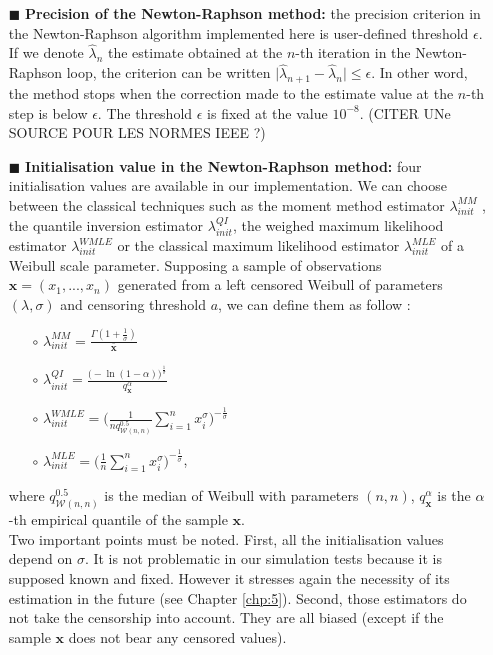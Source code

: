 \begin{itemize}
    \item[$\blacksquare$] \textbf{Precision of the Newton-Raphson method:} the precision criterion in the Newton-Raphson algorithm implemented here is user-defined threshold $\epsilon$. If we denote $\hat\lambda_n$ the estimate obtained at the $n$-th iteration in the Newton-Raphson loop, the criterion can be written $\lvert \hat\lambda_{n+1} - \hat\lambda_n\rvert \leq \epsilon$. In other word, the method stops when the correction made to the estimate value at the $n$-th step is below $\epsilon$. The threshold $\epsilon$ is fixed at the value $10^{-8}$. (CITER UNe SOURCE POUR LES NORMES IEEE ?)
    \item[$\blacksquare$] \textbf{Initialisation value in the Newton-Raphson method:} four initialisation values are available in our implementation. We can choose between the classical techniques such as the moment method estimator $\lambda_{init}^{MM}$ \cite{Johnson1994}, the quantile inversion estimator $\lambda_{init}^{QI}$, the weighed maximum likelihood estimator $\lambda_{init}^{WMLE}$ \cite{sadani2019new} or the classical maximum likelihood estimator $\lambda_{init}^{MLE}$ of a Weibull scale parameter. Supposing a sample of observations $\bm x = (x_1,...,x_n)$ generated from a left censored Weibull of parameters $(\lambda,\sigma)$ and censoring threshold $a$, we can define them as follow : 
    \begin{itemize}
        \item[$\circ$] $\lambda_{init}^{MM} =\frac{\Gamma(1+\frac{1}{\sigma})}{\bar{\bm x}}$ 
        \item[$\circ$] $\lambda_{init}^{QI} = \frac{\bigg(-\ln(1-\alpha)\bigg)^{\frac{1}{\sigma}}}{q_{\bm x}^\alpha}$
        \item[$\circ$] $\lambda_{init}^{WMLE} = \bigg(\frac{1}{nq^{0.5}_{\mathcal{W}(n,n)}}\sum_{i = 1}^nx_i^\sigma \bigg)^{-\frac{1}{\sigma}}$
        \item[$\circ$] $\lambda_{init}^{MLE} = \bigg(\frac{1}{n}\sum_{i = 1}^nx_i^\sigma \bigg)^{-\frac{1}{\sigma}}$, 
    \end{itemize}
    where $q^{0.5}_{\mathcal{W}(n,n)}$ is the median of Weibull with parameters $(n,n)$, $q_{\bm x}^\alpha$ is the $\alpha$-th empirical quantile of the sample $\bm x$. \\
     Two important points must be noted. First, all the initialisation values depend on $\sigma$. It is not problematic in our simulation tests because it is supposed known and fixed. However it stresses again the necessity of its estimation in the future (see Chapter \ref{chp:5}). Second, those estimators do not take the censorship into account. They are all biased (except if the sample $\bm x$ does not bear any censored values). \\

\end{itemize}
